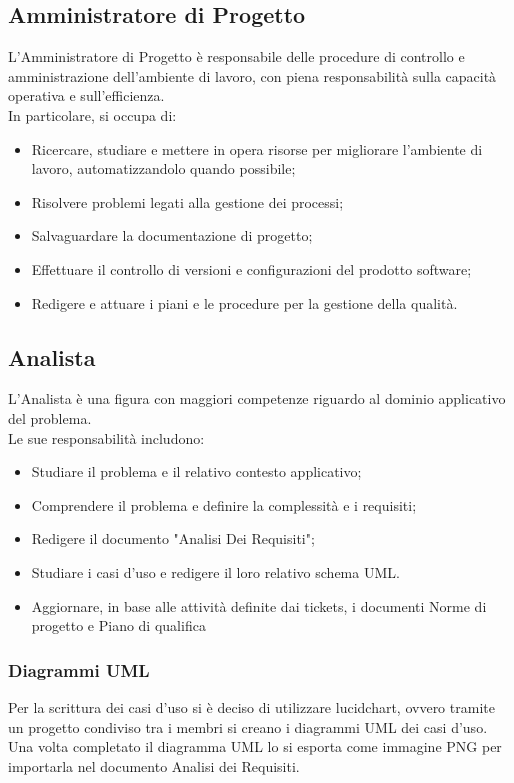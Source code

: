 \subsection{Amministratore di Progetto}
L'Amministratore di Progetto è responsabile delle procedure di controllo e amministrazione dell’ambiente di
lavoro, con piena responsabilità sulla capacità operativa e sull’efficienza.\\
In particolare, si occupa di:
\begin{itemize}
    \item Ricercare, studiare e mettere in opera risorse per migliorare l’ambiente di lavoro, automatizzandolo quando possibile;
    \item Risolvere problemi legati alla gestione dei processi;
    \item Salvaguardare la documentazione di progetto;
    \item Effettuare il controllo di versioni e configurazioni del prodotto software;
    \item Redigere e attuare i piani e le procedure per la gestione della qualità.
\end{itemize}
\subsection{Analista}
L'Analista è una figura con maggiori competenze riguardo al dominio applicativo del problema. \\
Le sue responsabilità includono:
\begin{itemize}
    \item Studiare il problema e il relativo contesto applicativo;
    \item Comprendere il problema e definire la complessità e i requisiti;
    \item Redigere il documento "Analisi Dei Requisiti";
    \item Studiare i casi d'uso e redigere il loro relativo schema UML.
    \item Aggiornare, in base alle attività definite dai tickets, i documenti Norme di progetto e Piano di qualifica
\end{itemize}
\subsubsection{Diagrammi UML}
Per la scrittura dei casi d'uso si è deciso di utilizzare lucidchart, ovvero tramite un progetto condiviso tra i membri si creano i diagrammi UML dei casi d'uso. Una volta completato il diagramma UML lo si esporta come immagine PNG per importarla nel documento Analisi dei Requisiti.
